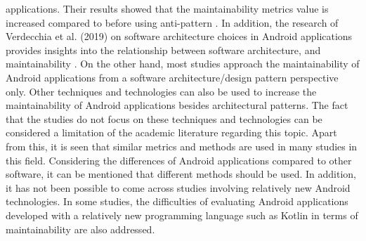 applications. Their results showed that the maintainability metrics value is increased compared to before using anti-pattern \cite{52}. In addition, the research of Verdecchia et al. (2019) on software architecture choices in Android applications provides insights into the relationship between software architecture, and maintainability \cite{14}. On the other hand, most studies approach the maintainability of Android applications from a software architecture/design pattern perspective only. Other techniques and technologies can also be used to increase the maintainability of Android applications besides architectural patterns. The fact that the studies do not focus on these techniques and technologies can be considered a limitation of the academic literature regarding this topic. Apart from this, it is seen that similar metrics and methods are used in many studies in this field. Considering the differences of Android applications compared to other software, it can be mentioned that different methods should be used. In addition, it has not been possible to come across studies involving relatively new Android technologies. In some studies, the difficulties of evaluating Android applications developed with a relatively new programming language such as Kotlin in terms of maintainability are also addressed.